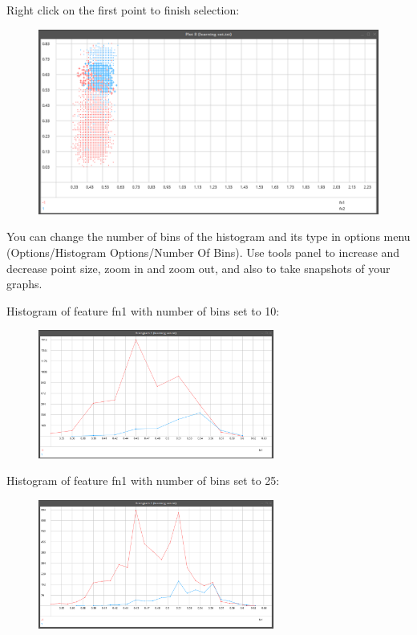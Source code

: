 \documentclass[a4paper,12pt,english]{report}
\begin{document}
Right click on the first point to finish selection:

\begin{figure}[htb]
\centering
\includegraphics[width=320pt]{fig5.png}
\end{figure}
 


\newpage
You can change the number of bins of the histogram and its type in options menu (Options/Histogram Options/Number Of Bins). Use tools panel to increase and decrease point size, zoom in and zoom out, and also to take snapshots of your graphs.



Histogram of feature fn1 with number of bins set to 10:
 
\begin{figure}[htb]
\centering
\includegraphics[width=220pt]{fig6.png}
\end{figure} 
 
 
 
Histogram of feature fn1 with number of bins set to 25:
 
 
 
\begin{figure}[htb]
\centering
\includegraphics[width=220pt]{fig7.png}
\end{figure} 
\end{document}

